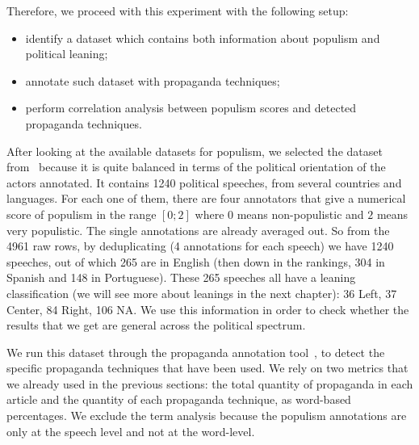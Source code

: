 

Therefore, we proceed with this experiment with the following setup:

\begin{itemize}
    \item identify a dataset which contains both information about populism and political leaning;
    \item annotate such dataset with propaganda techniques;
    \item perform correlation analysis between populism scores and detected propaganda techniques.
\end{itemize}

After looking at the available datasets for populism, we selected the dataset from~\citet{hawkins2019global} because it is quite balanced in terms of the political orientation of the actors annotated. %
It contains 1240 political speeches, from several countries and languages.
For each one of them, there are four annotators that give a numerical score of populism in the range $[0;2]$ where $0$ means non-populistic and $2$ means very populistic. The single annotations are already averaged out.
So from the 4961 raw rows, by deduplicating (4 annotations for each speech) we have 1240 speeches, out of which 265 are in English (then down in the rankings, 304 in Spanish and 148 in Portuguese).
These 265 speeches all have a leaning classification (we will see more about leanings in the next chapter): 36 Left, 37 Center, 84 Right, 106 NA. We use this information in order to check whether the results that we get are general across the political spectrum.

We run this dataset through the propaganda annotation tool~\citep{da2019fine}, to detect the specific propaganda techniques that have been used.
We rely on two metrics that we already used in the previous sections: the total quantity of propaganda in each article and the quantity of each propaganda technique, as word-based percentages. We exclude the term analysis because the populism annotations are only at the speech level and not at the word-level. %

